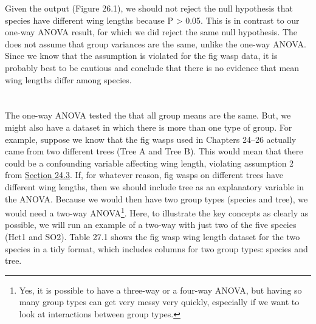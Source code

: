 \documentclass[
  openany]{krantz}
\begin{document}
\newpage

Given the  output (Figure 26.1), we should not reject the null hypothesis that species have different wing lengths because P \textgreater{} 0.05.
This is in contrast to our one-way ANOVA result, for which we did reject the same null hypothesis.
The  does not assume that group variances are the same, unlike the one-way ANOVA.
Since we know that the  assumption is violated for the fig wasp data, it is probably best to be cautious and conclude that there is no evidence that mean wing lengths differ among species.

\hypertarget{Chapter_27}{%
\chapter{\texorpdfstring{}{}}\label{Chapter_27}}

The one-way ANOVA tested the  that all group means are the same.
But, we might also have a dataset in which there is more than one type of group.
For example, suppose we know that the fig wasps used in Chapters 24--26 actually came from two different trees (Tree A and Tree B).
This would mean that there could be a confounding variable affecting wing length, violating assumption 2 from \protect\hyperlink{assumptions-of-anova}{Section 24.3}.
If, for whatever reason, fig wasps on different trees have different wing lengths, then we should include tree as an explanatory variable in the ANOVA.
Because we would then have two group types (species and tree), we would need a two-way ANOVA\footnote{Yes, it is possible to have a three-way or a four-way ANOVA, but having so many group types can get very messy very quickly, especially if we want to look at interactions between group types.}.
Here, to illustrate the key concepts as clearly as possible, we will run an example of a two-way  with just two of the five species (Het1 and SO2).
Table 27.1 shows the fig wasp wing length dataset for the two species in a tidy format, which includes columns for two group types: species and tree.
\end{document}
